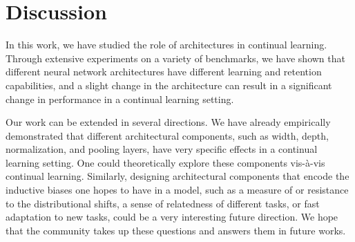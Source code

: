 \negspace{4mm}
\section{Discussion}\label{sec:discussion}

In this work, we have studied the role of architectures in continual learning. Through extensive experiments on a variety of benchmarks, we have shown that different neural network architectures have different learning and retention capabilities, and a slight change in the architecture can result in a significant change in performance in a continual learning setting. 

Our work can be extended in several directions. We have already empirically demonstrated that different architectural components, such as width, depth, normalization, and pooling layers, have very specific effects in a continual learning setting. One could theoretically explore these components vis-à-vis continual learning. Similarly, designing architectural components that encode the inductive biases one hopes to have in a model, such as a measure of or resistance to the distributional shifts, a sense of relatedness of different tasks, or fast adaptation to new tasks, could be a very interesting future direction. We hope that the community takes up these questions and answers them in future works.

